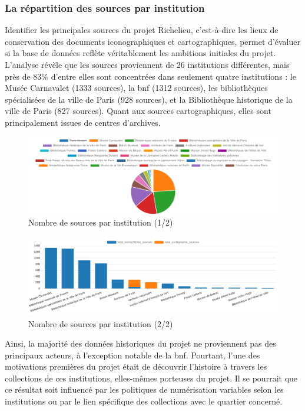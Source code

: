 \subsubsection{La répartition des sources par institution}
Identifier les principales sources du projet Richelieu, c'est-à-dire les lieux de conservation des documents iconographiques et cartographiques, permet d'évaluer si la base de données reflète véritablement les ambitions initiales du projet. L'analyse révèle que les sources proviennent de 26 institutions différentes, mais près de 83\% d'entre elles sont concentrées dans seulement quatre institutions : le Musée Carnavalet (1333 sources), la \acrshort{bnf} (1312 sources), les bibliothèques spécialisées de la ville de Paris (928 sources), et la Bibliothèque historique de la ville de Paris (827 sources). Quant aux sources cartographiques, elles sont principalement issues de centres d'archives. 
\begin{figure}[ht!]
    \centering
    \includegraphics[width=1\linewidth]{images/graphiques/total_sources_institution.png}
    \caption{Nombre de sources par institution (1/2)}
    \label{fig:sources_institution}
\end{figure}
\begin{figure}[ht!]
    \centering
    \includegraphics[width=1\linewidth]{images/graphiques/total_source_institution.png}
    \caption{Nombre de sources par institution (2/2)}
    \label{fig:sources_institution2}
\end{figure}
Ainsi, la majorité des données historiques du projet ne proviennent pas des principaux acteurs, à l'exception notable de la \acrshort{bnf}. Pourtant, l'une des motivations premières du projet était de découvrir l'histoire à travers les collections de ces institutions, elles-mêmes porteuses du projet. Il se pourrait que ce résultat soit influencé par les politiques de numérisation variables selon les institutions ou par le lien spécifique des collections avec le quartier concerné.

